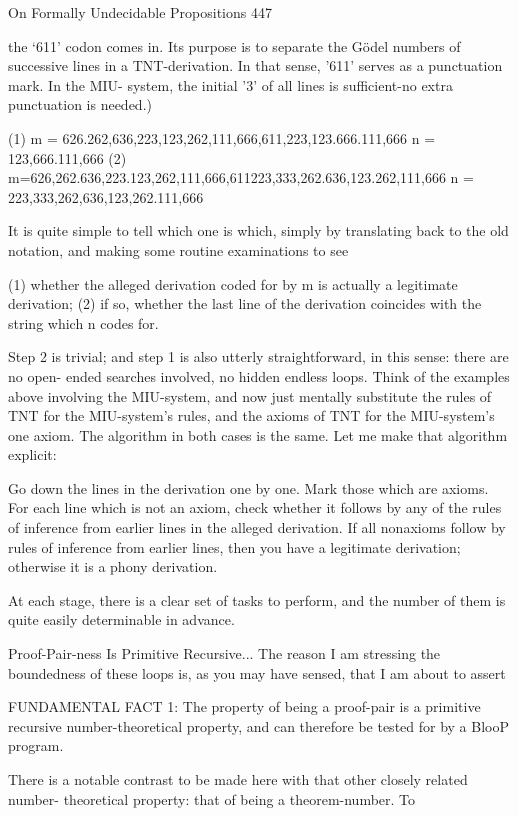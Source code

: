 On Formally Undecidable Propositions                                                    447

the `611' codon comes in. Its purpose is to separate the Gödel numbers of successive lines
in a TNT-derivation. In that sense, '611' serves as a punctuation mark. In the MIU-
system, the initial '3' of all lines is sufficient-no extra punctuation is needed.)

   (1) m = 626.262,636,223,123,262,111,666,611,223,123.666.111,666
         n = 123,666.111,666
   (2) m=626,262.636,223.123,262,111,666,611223,333,262.636,123.262,111,666
         n = 223,333,262,636,123,262.111,666

It is quite simple to tell which one is which, simply by translating back to the old
notation, and making some routine examinations to see

   (1) whether the alleged derivation coded for by m is actually a legitimate derivation;
   (2) if so, whether the last line of the derivation coincides with the string which n codes
            for.

Step 2 is trivial; and step 1 is also utterly straightforward, in this sense: there are no open-
ended searches involved, no hidden endless loops. Think of the examples above
involving the MIU-system, and now just mentally substitute the rules of TNT for the
MIU-system's rules, and the axioms of TNT for the MIU-system's one axiom. The
algorithm in both cases is the same. Let me make that algorithm explicit:

     Go down the lines in the derivation one by one. Mark those which are axioms.
     For each line which is not an axiom, check whether it follows by any of the
           rules of inference from earlier lines in the alleged derivation.
     If all nonaxioms follow by rules of inference from earlier lines, then you have a
           legitimate derivation; otherwise it is a phony derivation.

At each stage, there is a clear set of tasks to perform, and the number of them is quite
easily determinable in advance.

                     Proof-Pair-ness Is Primitive Recursive...
       The reason I am stressing the boundedness of these loops is, as you may have
sensed, that I am about to assert

   FUNDAMENTAL FACT 1: The property of being a proof-pair is a primitive
   recursive number-theoretical property, and can therefore be tested for by a BlooP
   program.

        There is a notable contrast to be made here with that other closely related number-
theoretical property: that of being a theorem-number. To




